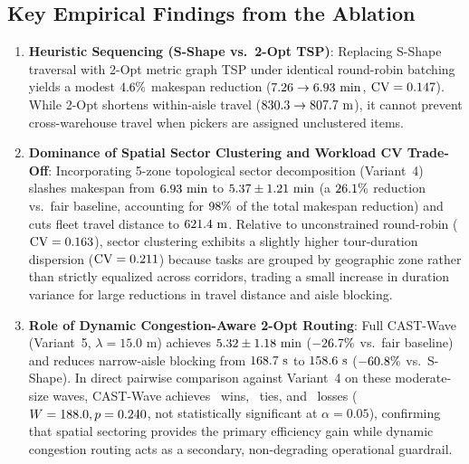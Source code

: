 \documentclass[11pt,a4paper]{article}
\begin{document}
\subsection{Key Empirical Findings from the Ablation}
\begin{enumerate}[leftmargin=*]
    \item \textbf{Heuristic Sequencing (S-Shape vs.\ 2-Opt TSP)}: Replacing S-Shape traversal with 2-Opt metric graph TSP under identical round-robin batching yields a modest $4.6\%$ makespan reduction ($7.26 \rightarrow 6.93\text{ min}$, $\text{CV} = 0.147$). While 2-Opt shortens within-aisle travel ($830.3 \rightarrow 807.7\text{ m}$), it cannot prevent cross-warehouse travel when pickers are assigned unclustered items.
    \item \textbf{Dominance of Spatial Sector Clustering and Workload CV Trade-Off}: Incorporating 5-zone topological sector decomposition (Variant~4) slashes makespan from $6.93\text{ min}$ to $5.37 \pm 1.21\text{ min}$ (a $26.1\%$ reduction vs.\ fair baseline, accounting for $98\%$ of the total makespan reduction) and cuts fleet travel distance to $621.4\text{ m}$. Relative to unconstrained round-robin ($\text{CV} = 0.163$), sector clustering exhibits a slightly higher tour-duration dispersion ($\text{CV} = 0.211$) because tasks are grouped by geographic zone rather than strictly equalized across corridors, trading a small increase in duration variance for large reductions in travel distance and aisle blocking.
    \item \textbf{Role of Dynamic Congestion-Aware 2-Opt Routing}: Full CAST-Wave (Variant~5, $\lambda = 15.0\text{ m}$) achieves $5.32 \pm 1.18\text{ min}$ ($-26.7\%$ vs.\ fair baseline) and reduces narrow-aisle blocking from $168.7\text{ s}$ to $158.6\text{ s}$ ($-60.8\%$ vs.\ S-Shape). In direct pairwise comparison against Variant~4 on these moderate-size waves, CAST-Wave achieves \WinsVsSector~wins, \TiesVsSector~ties, and \LossesVsSector~losses ($W = 188.0, p = 0.240$, not statistically significant at $\alpha = 0.05$), confirming that spatial sectoring provides the primary efficiency gain while dynamic congestion routing acts as a secondary, non-degrading operational guardrail.
\end{enumerate}
\end{document}
